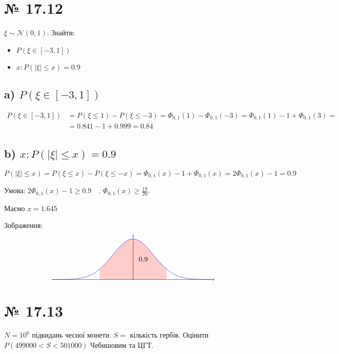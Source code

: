 \documentclass[11pt, a4paper]{article} %
\begin{document}

\section*{№ 17.12}
\begin{mdframed}
    \(\xi \sim \mathcal{N}(0,1)\). Знайти:
    \begin{itemize}
        \item \(P(\xi \in [-3, 1])\)
        \item \(x : P(|\xi| \le x) = 0.9\)
    \end{itemize}
\end{mdframed}

\subsection*{a) \(P(\xi \in [-3, 1])\)}
\begin{align*}
    P(\xi \in [-3, 1]) &= P(\xi \le 1) - P(\xi \le -3) = \Phi_{0,1}(1) - \Phi_{0,1}(-3) = \Phi_{0,1}(1) - 1 + \Phi_{0,1}(3) = \\
    &= 0.841 - 1 + 0.999 = \boxed{0.84}
\end{align*}

\subsection*{b) \(x : P(|\xi| \le x) = 0.9\)}

\[P(|\xi| \le x) = P(\xi \le x) - P(\xi \le -x) = \Phi_{0,1}(x) - 1 + \Phi_{0,1}(x) = 2\Phi_{0,1}(x) - 1 = 0.9\]

Умова: \(2\Phi_{0,1}(x) - 1 \ge 0.9\quad\). \(\Phi_{0,1}(x) \ge \frac{19}{20}\).

Маємо \(\boxed{x = 1.645}\)

Зображення: \[
    \begin{tikzpicture}
        \fill[red!20, domain=-1.65:1.65, smooth, variable=\x] (-1.65,0) -- plot ({\x}, {2 * exp(-\x*\x / 2)}) -- (1.65,0);
        \draw[scale=1, domain=-4:4, smooth, variable=\x, blue] plot ({\x}, {2 * exp(-\x*\x / 2)});
        \draw[->] (-4,0) -- (4,0);
        \draw[->] (0,0) -- (0,2.2);
        \node at (0.5,1) {$0.9$}; 
    \end{tikzpicture}
\]

\section*{№ 17.13}
\begin{mdframed}
    $N = 10^6$ підкидань чесної монети. $S = $ кількість гербів. 
    Оцінити $P(499000 < S < 501000)$ Чебишовим та ЦГТ.
\end{mdframed}
\end{document}
